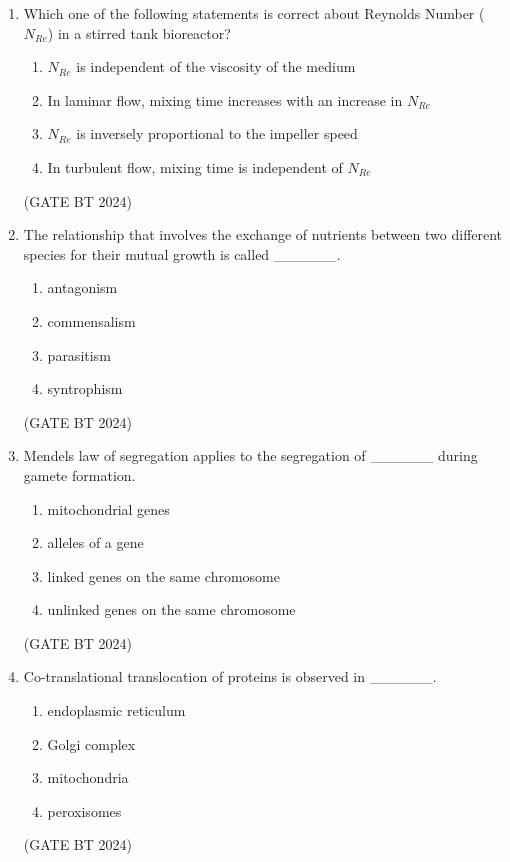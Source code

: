 \documentclass[journal,12pt,onecolumn]{IEEEtran}
\theoremstyle{remark}
\begin{document}
\begin{enumerate}
\item 
Which one of the following statements is correct about Reynolds Number ($N_{Re}$) in a stirred tank bioreactor?

\begin{enumerate}
    \item $N_{Re}$ is independent of the viscosity of the medium
    \item In laminar flow, mixing time increases with an increase in $N_{Re}$
    \item $N_{Re}$ is inversely proportional to the impeller speed
    \item In turbulent flow, mixing time is independent of $N_{Re}$
\end{enumerate}
\hfill(GATE BT 2024)

\item 
The relationship that involves the exchange of nutrients between two different species for their mutual growth is called \_\_\_\_\_\_.

\begin{enumerate}
    \item antagonism
    \item commensalism
    \item parasitism
    \item syntrophism
\end{enumerate}
\hfill(GATE BT 2024)

\item 
Mendels law of segregation applies to the segregation of \_\_\_\_\_\_ during gamete formation.

\begin{enumerate}
    \item mitochondrial genes
    \item alleles of a gene
    \item linked genes on the same chromosome
    \item unlinked genes on the same chromosome
\end{enumerate}
\hfill(GATE BT 2024)

\item 
Co-translational translocation of proteins is observed in \_\_\_\_\_\_.

\begin{enumerate}
    \item endoplasmic reticulum
    \item Golgi complex
    \item mitochondria
    \item peroxisomes
\end{enumerate}
\hfill(GATE BT 2024)


\end{enumerate}
\end{document}
